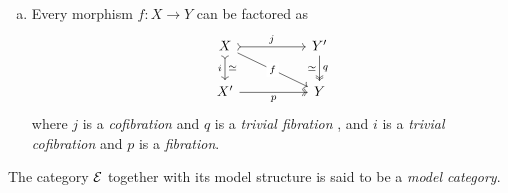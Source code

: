 \begin{definition}
\begin{enumerate}[(a)]
        \item Every morphism \(f: X \to Y\) can be factored as
              \[
                  \begin{tikzcd}
                      X
                      \ar[rr, tail, "j"]
                      \ar[rrd, "f" description]
                      \ar[d, tail, "i"', "\dis"]
                      &&Y' \ar[d, two heads, "\dis"', "q"]
                      \\
                      X' \ar[rr, two heads, "p"']
                      &&Y
                  \end{tikzcd}
              \]
              where \(j\) is a \emph{cofibration} and \(q\) is a \emph{trivial fibration} ,
              and \(i\) is a \emph{trivial cofibration} and \(p\) is a \emph{fibration}.
    \end{enumerate}
    The category \(\mathcal E\) together with its model structure is said to be a
    \emph{model category}.
\end{definition}

